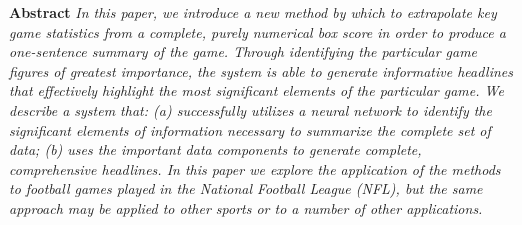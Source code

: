 \documentclass[12pt, journal]{IEEEtran}
\begin{document}







\maketitle








%
\IEEEpeerreviewmaketitle


\textbf{Abstract }\textit{In this paper, we introduce a new method by which to extrapolate key game statistics from a complete, purely numerical box score in order to produce a one-sentence summary of the game. Through identifying the particular game figures of greatest importance, the system is able to generate informative headlines that effectively highlight the most significant elements of the particular game. We describe a system that: (a) successfully utilizes a neural network to identify the significant elements of information necessary to summarize the complete set of data; (b) uses the important data components to generate complete, comprehensive headlines. In this paper we explore the application of the methods to football games played in the National Football League (NFL), but the same approach may be applied to other sports or to a number of other applications. }
\end{document}
